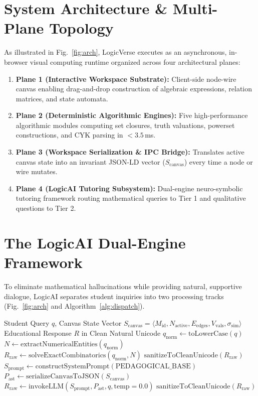 \documentclass[conference]{IEEEtran}
\begin{document}
\section{System Architecture \& Multi-Plane Topology}
As illustrated in Fig.~\ref{fig:arch}, LogicVerse executes as an asynchronous, in-browser visual computing runtime organized across four architectural planes:
\begin{enumerate}
    \item \textbf{Plane 1 (Interactive Workspace Substrate):} Client-side node-wire canvas enabling drag-and-drop construction of algebraic expressions, relation matrices, and state automata.
    \item \textbf{Plane 2 (Deterministic Algorithmic Engines):} Five high-performance algorithmic modules computing set closures, truth valuations, powerset constructions, and CYK parsing in $<3.5$\,ms.
    \item \textbf{Plane 3 (Workspace Serialization \& IPC Bridge):} Translates active canvas state into an invariant JSON-LD vector ($S_{\text{canvas}}$) every time a node or wire mutates.
    \item \textbf{Plane 4 (LogicAI Tutoring Subsystem):} Dual-engine neuro-symbolic tutoring framework routing mathematical queries to Tier 1 and qualitative questions to Tier 2.
\end{enumerate}

\section{The LogicAI Dual-Engine Framework}
To eliminate mathematical hallucinations while providing natural, supportive dialogue, LogicAI separates student inquiries into two processing tracks (Fig.~\ref{fig:arch} and Algorithm~\ref{alg:dispatch}).

\begin{algorithm}[htbp]
\caption{Dual-Engine Intent Dispatch \& Workspace Grounding}
\label{alg:dispatch}
\begin{algorithmic}[1]
\REQUIRE Student Query $q$, Canvas State Vector $S_{\text{canvas}} = \langle M_{\text{id}}, N_{\text{active}}, E_{\text{edges}}, V_{\text{vals}}, \sigma_{\text{sim}} \rangle$
\ENSURE Educational Response $R$ in Clean Natural Unicode
\STATE $q_{\text{norm}} \gets \text{toLowerCase}(q)$
\STATE $N \gets \text{extractNumericalEntities}(q_{\text{norm}})$
    \STATE $R_{\text{raw}} \gets \text{solveExactCombinatorics}(q_{\text{norm}}, N)$
    \RETURN $\text{sanitizeToCleanUnicode}(R_{\text{raw}})$
\ELSE
    \STATE $S_{\text{prompt}} \gets \text{constructSystemPrompt}(\text{PEDAGOGICAL\_BASE})$
    \STATE $P_{\text{ast}} \gets \text{serializeCanvasToJSON}(S_{\text{canvas}})$
    \STATE $R_{\text{raw}} \gets \text{invokeLLM}(S_{\text{prompt}}, P_{\text{ast}}, q, \text{temp}=0.0)$
    \RETURN $\text{sanitizeToCleanUnicode}(R_{\text{raw}})$
\ENDIF
\end{algorithmic}
\end{algorithm}
\end{document}
